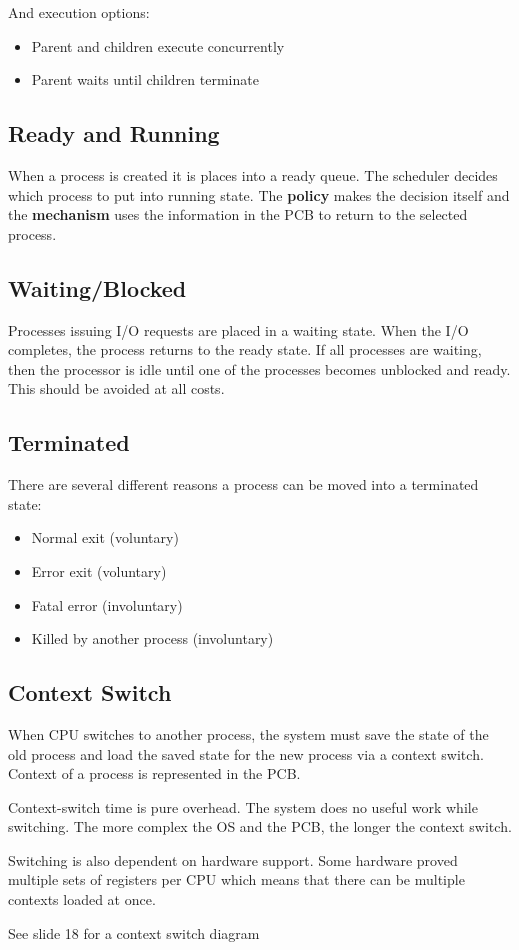 \documentclass{article}
\begin{document}
And execution options:
\begin{itemize}
	\item Parent and children execute concurrently
	\item Parent waits until children terminate
\end{itemize}

\subsection{Ready and Running}
When a process is created it is places into a ready queue.
The scheduler decides which process to put into running state.
The \textbf{policy} makes the decision itself and the \textbf{mechanism} uses the information in the PCB to return to the selected process.

\subsection{Waiting/Blocked}
Processes issuing I/O requests are placed in a waiting state.
When the I/O completes, the process returns to the ready state.
If all processes are waiting, then the processor is idle until one of the processes becomes unblocked and ready.
This should be avoided at all costs.

\subsection{Terminated}
There are several different reasons a process can be moved into a terminated state:
\begin{itemize}
	\item Normal exit (voluntary)
	\item Error exit (voluntary)
	\item Fatal error (involuntary)
	\item Killed by another process (involuntary)
\end{itemize}

\subsection{Context Switch}
When CPU switches to another process, the system must save the state of the old process and load the saved state for the new process via a context switch.
Context of a process is represented in the PCB.

Context-switch time is pure overhead.
The system does no useful work while switching.
The more complex the OS and the PCB, the longer the context switch.

Switching is also dependent on hardware support.
Some hardware proved multiple sets of registers per CPU which means that there can be multiple contexts loaded at once.

See slide 18 for a context switch diagram
\end{document}
